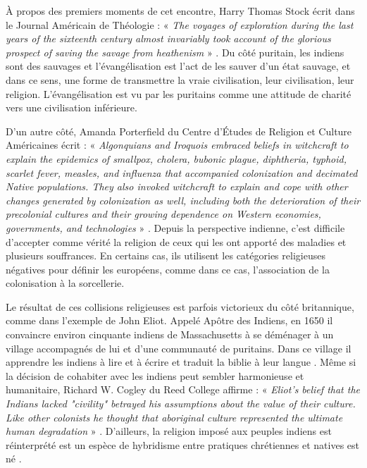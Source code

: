 \documentclass{article}
\begin{document}
À propos des premiers moments de cet encontre, Harry Thomas Stock écrit dans le Journal Américain de Théologie : « \emph{The voyages of exploration during the last years of the sixteenth century almost invariably took account of the glorious prospect of saving the savage from heathenism} » \cite{stock-5}. Du côté puritain, les indiens sont des sauvages et l'évangélisation est l'act de les sauver d'un état sauvage, et dans ce sens, une forme de transmettre la vraie civilisation, leur civilisation, leur religion. L'évangélisation est vu par les puritains comme une attitude de charité vers une civilisation inférieure.

D'un autre côté, Amanda Porterfield du Centre d'Études de Religion et Culture Américaines écrit : « \emph{Algonquians and Iroquois embraced beliefs in witchcraft to explain the epidemics of smallpox, cholera, bubonic plague, diphtheria, typhoid, scarlet fever, measles, and influenza that accompanied colonization and decimated Native populations. They also invoked witchcraft to explain and cope with other changes generated by colonization as well, including both the deterioration of their precolonial cultures and their growing dependence on Western economies, governments, and technologies} » \cite{poter-6}. Depuis la perspective indienne, c'est difficile d'accepter comme vérité la religion de ceux qui les ont apporté des maladies et plusieurs souffrances. En certains cas, ils utilisent les catégories religieuses négatives pour définir les européens, comme dans ce cas, l'association de la colonisation à la sorcellerie.

Le résultat de ces collisions religieuses est parfois victorieux du côté britannique, comme dans l'exemple de John Eliot. Appelé Apôtre des Indiens, en 1650 il convaincre environ cinquante indiens de Massachusetts à se déménager à un village accompagnés de lui et d'une communauté de puritains. Dans ce village il apprendre les indiens à lire et à écrire et traduit la biblie à leur langue \cite{eliot-7}. Même si la décision de cohabiter avec les indiens peut sembler harmonieuse et humanitaire, Richard W. Cogley du Reed College affirme : « \emph{Eliot's belief that the Indians lacked "civility" betrayed his assumptions about the value of their culture. Like other colonists he thought that aboriginal culture represented the ultimate human degradation} » \cite{eliot-8}. D'ailleurs, la religion imposé aux peuples indiens est réinterprété est un espèce de hybridisme entre pratiques chrétiennes et natives est né \cite{fisher-9}.
\end{document}
